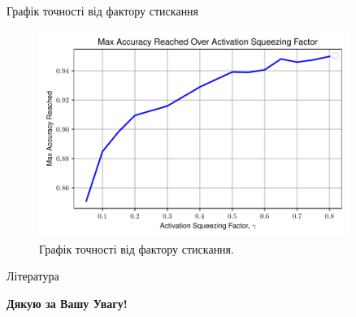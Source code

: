 \documentclass{zkdl-presentation-template}
\begin{document}
    \begin{frame}{Графік точності від фактору стискання}
        \begin{figure}
            \centering
            \includegraphics[width=0.9\textwidth]{images/max_accuracy_over_squeeze.pdf}
            \caption{Графік точності від фактору стискання.}
            \label{figure:encoder-decoder-graph}
        \end{figure}
    \end{frame}

    \begin{frame}[allowframebreaks]{Література}
        \printbibliography
    \end{frame}

    \begin{frame}
      \centering
      \LARGE
      \textbf{Дякую за Вашу Увагу!} \\
      
      \vspace{0.2cm} \Huge {} \large \\
    \end{frame}
\end{document}
